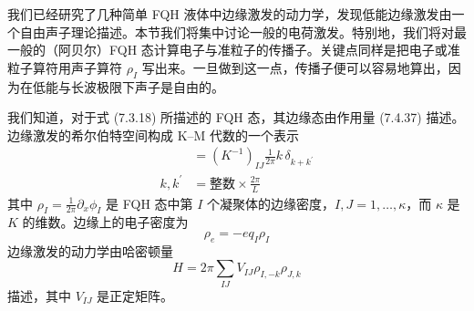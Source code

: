 我们已经研究了几种简单 FQH 液体中边缘激发的动力学，发现低能边缘激发由一个自由声子理论描述。本节我们将集中讨论一般的电荷激发。特别地，我们将对最一般的（阿贝尔）FQH 态计算电子与准粒子的传播子。关键点同样是把电子或准粒子算符用声子算符 $\rho_{I}$ 写出来。一旦做到这一点，传播子便可以容易地算出，因为在低能与长波极限下声子是自由的。

我们知道，对于式 (7.3.18) 所描述的 FQH 态，其边缘态由作用量 (7.4.37) 描述。边缘激发的希尔伯特空间构成 K--M 代数的一个表示
\begin{align*}
[\rho_{Ik},\rho_{Jk^{\prime}}]&=(K^{-1})_{IJ}\frac{1}{2\pi}k\,\delta_{k+k^{\prime}}\\
k,k^{\prime}&=\text{整数}\times\frac{2\pi}{L} \tag{7.4.38}
\end{align*}
其中 $\rho_{I}=\frac{1}{2\pi}\partial_{x}\phi_{I}$ 是 FQH 态中第 $I$ 个凝聚体的边缘密度，$I,J=1,\ldots,\kappa$，而 $\kappa$ 是 $K$ 的维数。边缘上的电子密度为
\begin{equation*}
\rho_{e}=-eq_{I}\rho_{I}
\end{equation*}
边缘激发的动力学由哈密顿量
\begin{equation*}
H=2\pi\sum_{IJ}V_{IJ}\rho_{I,-k}\rho_{J,k} \tag{7.4.39}
\end{equation*}
描述，其中 $V_{IJ}$ 是正定矩阵。

